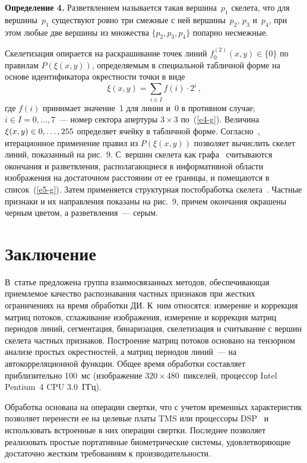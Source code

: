 \begin{multicols}{2}
  \smallskip
  
  \noindent
  \textbf{Определение 4.} Разветвлением называется такая вершина~$p_1$ 
скелета, что для вершины~$p_1$ существуют ровно три смежные с ней 
вершины~$p_2$, $p_3$ и~$p_4$, при этом любые две вершины из множества 
$\{p_2, p_3, p_4\}$ попарно несмежные.


  Скелетизация опирается на раскрашивание точек линий $f_0^{(2)}(x,y)\in 
\{0\}$ по правилам $P(\xi(x,y))$, определяемым в специальной табличной 
форме на основе идентификатора окрестности точки в виде
  $$
  \xi(x,y) =\sum\limits_{i\in I} f(i)\cdot 2^i\,,
  $$
где $f(i)$ принимает значение~1 для линии и~0 в противном случае; $i\in 
I=0, \ldots  ,7$~--- \mbox{номер} сектора апер\-ту\-ры $3\times 3$ по~(\ref{e4-g}). Величина 
$\xi(x,y)\hm\in 0,\ldots , 255$ определяет ячейку в табличной форме. 
Согласно~\cite{6-g}, итерационное применение правил из $P(\xi(x,y))$ 
позволяет вычислить скелет линий, показанный на рис.~9. С~вершин скелета 
как графа~\cite{7-g} считываются окончания и разветвления, располагающиеся 
в информативной области изоб\-ра\-же\-ния на достаточном расстоянии от ее 
границы, и помещаются в список~(\ref{e5-g}). Затем применяется структурная 
пост\-обра\-бот\-ка скелета~\cite{1-g}. Частные признаки и их направления 
показаны на рис.~9, причем окончания окрашены черным цветом, а 
разветвления~--- серым.

\vspace*{6pt}

\section{Заключение}
  
  В~статье предложена группа взаимосвязанных методов, обеспечивающая 
приемлемое качество распознавания частных признаков при жестких 
ограничениях на время обработки ДИ. К~ним относятся: измерение и 
коррекция матриц потоков, сглаживание изображения, измерение и коррекция 
матриц периодов линий, сегментация, бинаризация, скелетизация и считывание 
с вершин скелета частных признаков. Построение матриц потоков основано на 
тензорном анализе простых окрестностей, а матриц периодов линий~--- на 
автокорреляционной функции. Общее время обработки составляет 
приблизительно 100~мс (изображение $320 \times 480$~пикселей, процессор 
Intel Pentium~4 CPU 3.0~ГГц). 
  
  Обработка основана на операции свертки, что с учетом временн$\acute{\mbox{ы}}$х 
характеристик позволяет перенести ее на целевые платы TMS или 
процессоры DSP~\cite{8-g} и использовать встроенные в них операции 
свертки. Последнее позволяет реализовать простые портативные 
биометрические системы, удовлетворяющие достаточно жестким требованиям 
к производительности.
  

\end{multicols}
